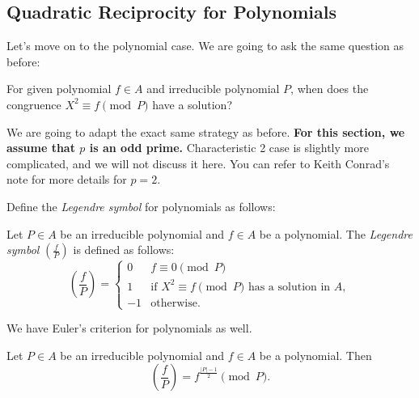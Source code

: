 \subsection{Quadratic Reciprocity for Polynomials}
\label{subsec:quadratic-reciprocity-polynomials}

Let's move on to the polynomial case.
We are going to ask the same question as before:
\begin{myquote}
For given polynomial $f \in A$ and irreducible polynomial $P$, when does the congruence $X^2 \equiv f \pmod{P}$ have a solution?
\end{myquote}
We are going to adapt the exact same strategy as before.
\textbf{For this section, we assume that $p$ is an odd prime.}
Characteristic 2 case is slightly more complicated, and we will not discuss it here.
You can refer to Keith Conrad's note \cite{conrad_rec_2} for more details for $p = 2$.

Define the \emph{Legendre symbol} for polynomials as follows:
\begin{definition}
    Let $P \in A$ be an irreducible polynomial and $f \in A$ be a polynomial.
    The \emph{Legendre symbol} $\left(\frac{f}{P}\right)$ is defined as follows:
    \begin{equation}
        \left(\frac{f}{P}\right) = \begin{cases}
            0 & f \equiv 0 \pmod{P} \\
            1 & \text{if } X^2 \equiv f \pmod{P} \text{ has a solution in } A, \\
            -1 & \text{otherwise.}
        \end{cases}
        \label{eqn:legendre-symbol-poly}
    \end{equation}
\end{definition}

We have Euler's criterion for polynomials as well.
\begin{theorem}
    \label{thm:euler-criterion-poly}
    Let $P \in A$ be an irreducible polynomial and $f \in A$ be a polynomial.
    Then
    \begin{equation}
        \left(\frac{f}{P}\right) = f^{\frac{|P| - 1}{2}} \pmod{P}.
        \label{eqn:euler-criterion-poly}
    \end{equation}
\end{theorem}

